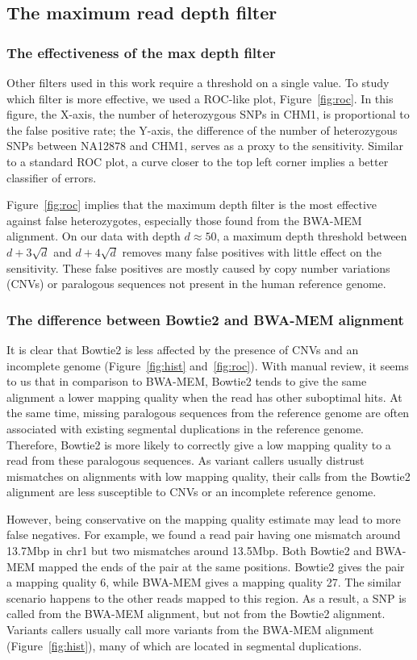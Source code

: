 \documentclass{bioinfo}
\begin{document}
\subsection{The maximum read depth filter}

\subsubsection{The effectiveness of the max depth filter}
Other filters used in this work require a threshold on a single value. To study
which filter is more effective, we used a ROC-like plot,
Figure~\ref{fig:roc}. In this figure, the X-axis, the number of heterozygous
SNPs in CHM1, is proportional to the false positive rate; the Y-axis, the
difference of the number of heterozygous SNPs between NA12878 and CHM1, serves
as a proxy to the sensitivity. Similar to a standard ROC plot, a curve closer
to the top left corner implies a better classifier of errors.

Figure~\ref{fig:roc} implies that the maximum depth filter is the most
effective against false heterozygotes, especially those found from the BWA-MEM
alignment. On our data with depth $d\approx50$, a maximum depth threshold
between $d+3\sqrt{d}$ and $d+4\sqrt{d}$ removes many false positives with
little effect on the sensitivity. These false positives are mostly caused by
copy number variations (CNVs) or paralogous sequences not present in the human
reference genome.

\subsubsection{The difference between Bowtie2 and BWA-MEM alignment}
It is clear that Bowtie2 is less affected by the presence of CNVs and an
incomplete genome (Figure~\ref{fig:hist} and~\ref{fig:roc}). With manual
review, it seems to us that in comparison to BWA-MEM, Bowtie2 tends to give the
same alignment a lower mapping quality when the read has other suboptimal hits.
At the same time, missing paralogous sequences from the reference genome are
often associated with existing segmental duplications in the reference genome.
Therefore, Bowtie2 is more likely to correctly give a low mapping quality to a
read from these paralogous sequences. As variant callers usually distrust
mismatches on alignments with low mapping quality, their calls from the Bowtie2
alignment are less susceptible to CNVs or an incomplete reference genome.

However, being conservative on the mapping quality estimate may lead to more false
negatives. For example, we found a read pair having one mismatch around
13.7Mbp in chr1 but two mismatches around 13.5Mbp. Both Bowtie2 and BWA-MEM
mapped the ends of the pair at the same positions. Bowtie2 gives the pair a
mapping quality 6, while BWA-MEM gives a mapping quality 27. The similar
scenario happens to the other reads mapped to this region. As a result, a SNP
is called from the BWA-MEM alignment, but not from the Bowtie2 alignment.
Variants callers usually call more variants from the BWA-MEM alignment
(Figure~\ref{fig:hist}), many of which are located in segmental duplications.
\end{document}
